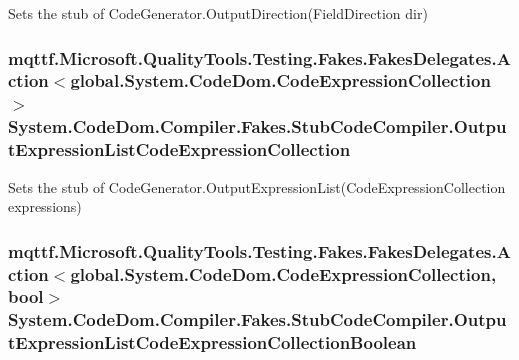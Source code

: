 Sets the stub of Code\-Generator.\-Output\-Direction(\-Field\-Direction dir)

\hypertarget{class_system_1_1_code_dom_1_1_compiler_1_1_fakes_1_1_stub_code_compiler_adf052893b377b1d981671da9598d5330}{
\subsubsection[{Output\-Expression\-List\-Code\-Expression\-Collection}]{\setlength{\rightskip}{0pt plus 5cm}mqttf.\-Microsoft.\-Quality\-Tools.\-Testing.\-Fakes.\-Fakes\-Delegates.\-Action$<$global.\-System.\-Code\-Dom.\-Code\-Expression\-Collection$>$ System.\-Code\-Dom.\-Compiler.\-Fakes.\-Stub\-Code\-Compiler.\-Output\-Expression\-List\-Code\-Expression\-Collection}}\label{class_system_1_1_code_dom_1_1_compiler_1_1_fakes_1_1_stub_code_compiler_adf052893b377b1d981671da9598d5330}


Sets the stub of Code\-Generator.\-Output\-Expression\-List(\-Code\-Expression\-Collection expressions)

\hypertarget{class_system_1_1_code_dom_1_1_compiler_1_1_fakes_1_1_stub_code_compiler_ac6544de7a7a1dc95afb88369d70eadc9}{
\subsubsection[{Output\-Expression\-List\-Code\-Expression\-Collection\-Boolean}]{\setlength{\rightskip}{0pt plus 5cm}mqttf.\-Microsoft.\-Quality\-Tools.\-Testing.\-Fakes.\-Fakes\-Delegates.\-Action$<$global.\-System.\-Code\-Dom.\-Code\-Expression\-Collection, bool$>$ System.\-Code\-Dom.\-Compiler.\-Fakes.\-Stub\-Code\-Compiler.\-Output\-Expression\-List\-Code\-Expression\-Collection\-Boolean}}\label{class_system_1_1_code_dom_1_1_compiler_1_1_fakes_1_1_stub_code_compiler_ac6544de7a7a1dc95afb88369d70eadc9}


